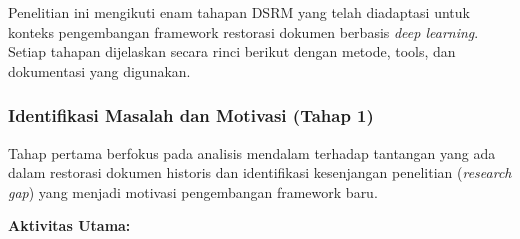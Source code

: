 \documentclass[12pt,a4paper]{article}
\begin{document}
Penelitian ini mengikuti enam tahapan DSRM yang telah diadaptasi untuk konteks pengembangan framework restorasi dokumen berbasis \textit{deep learning}. Setiap tahapan dijelaskan secara rinci berikut dengan metode, tools, dan dokumentasi yang digunakan.

\subsubsection{Identifikasi Masalah dan Motivasi (Tahap 1)}
\label{subsubsec:identifikasi-masalah}

Tahap pertama berfokus pada analisis mendalam terhadap tantangan yang ada dalam restorasi dokumen historis dan identifikasi kesenjangan penelitian (\textit{research gap}) yang menjadi motivasi pengembangan framework baru.

\textbf{Aktivitas Utama:}
\end{document}
